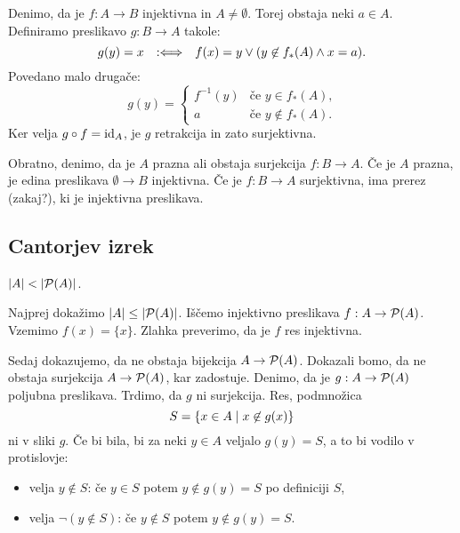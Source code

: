 \begin{dokaz}
  Denimo, da je $f : A \to B$ injektivna in $A \neq \emptyset$. Torej obstaja neki $a \in A$.
  Definiramo preslikavo $g : B \to A$ takole:
  \begin{equation*}
    g(y) = x  \defiff f(x) = y \lor (y \not\in f_{*}(A) \land x = a).
  \end{equation*}
  Povedano malo drugače:
  \begin{equation*}
    g(y) =
    \begin{cases}
      f^{-1}(y) & \text{če $y \in f_{*}(A)$,} \\
      a         & \text{če $y \not\in f_{*}(A)$.}
    \end{cases}
  \end{equation*}
  Ker velja $g \circ f = \id[A]$, je $g$ retrakcija in zato surjektivna.

  Obratno, denimo, da je $A$ prazna ali obstaja surjekcija $f : B \to A$. Če je $A$
  prazna, je edina preslikava $\emptyset \to B$ injektivna. Če je $f : B \to A$ surjektivna,
  ima prerez (zakaj?), ki je injektivna preslikava.
\end{dokaz}


\subsection{Cantorjev izrek}

\begin{izrek}[Cantor]
  $|A| < |\pow{A}|$.
\end{izrek}

\begin{dokaz}
  Najprej dokažimo $|A| \leq |\pow{A}|$. Iščemo injektivno preslikava $f : A \to \pow{A}$. Vzemimo $f(x) = \{x\}$. Zlahka preverimo, da je $f$ res injektivna.

  Sedaj dokazujemo, da ne obstaja bijekcija $A \to \pow{A}$. Dokazali bomo, da ne obstaja surjekcija $A \to \pow{A}$, kar zadostuje. Denimo, da je $g : A \to \pow{A}$ poljubna preslikava. Trdimo, da $g$ ni surjekcija. Res, podmnožica
  \begin{equation*}
    S = \set{x \in A \mid x \not\in g(x) }
  \end{equation*}
  ni v sliki $g$. Če bi bila, bi za neki $y \in A$ veljalo $g(y) = S$, a to bi vodilo v protislovje:
  \begin{itemize}
  \item velja $y \not\in S$: če $y \in S$ potem $y \not\in g(y) = S$ po definiciji $S$,
  \item velja $\lnot (y \not\in S)$: če $y \not\in S$ potem $y \not\in g(y) = S$.
  \end{itemize}
\end{dokaz}


